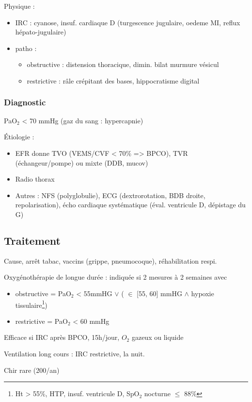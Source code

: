 \documentclass{article}
\begin{document}
Physique : 
\begin{itemize}
\item IRC : cyanose, insuf. cardiaque D (turgescence jugulaire, oedeme MI, reflux
  hépato-jugulaire)
\item patho : 
  \begin{itemize}
  \item obstructive : distension thoracique, dimin. bilat murmure vésicul
  \item restrictive : râle crépitant des bases, hippocratisme digital
  \end{itemize}
\end{itemize}

\subsubsection{Diagnostic}
\label{sec:org7599c0f}
PaO\(_{\text{2}}\) < 70 mmHg (gaz du sang : hypercapnie)

Étiologie :
\begin{itemize}
\item EFR donne TVO (VEMS/CVF < 70\% => BPCO), TVR (échangeur/pompe) ou
mixte (DDB, mucov)
\item  Radio thorax
\item Autres : NFS (polyglobulie), ECG (dextrorotation, BDB droite, repolarisation),
écho cardiaque systématique (éval. ventricule D, dépistage du G)
\end{itemize}

\subsection{Traitement}
\label{sec:org870a2d5}
Cause, arrêt tabac, vaccins (grippe, pneumocoque), réhabilitation respi.

Oxygénothérapie de longue durée : indiquée si 2 mesures à 2 semaines avec
\begin{itemize}
\item obstructive = PaO\(_{\text{2}}\) < 55mmHG \(\vee\) ( \(\in\) [55, 60] mmHG \(\wedge\) hypoxie
  tissulaire\footnote{Ht > 55\%, HTP, insuf. ventricule D, SpO\(_{\text{2}}\) nocturne \(\le\) 88\%})
\item restrictive = PaO\(_{\text{2}}\) < 60 mmHg
\end{itemize}
Efficace si  IRC après BPCO, 15h/jour, $O_2$ gazeux ou liquide

Ventilation long cours : IRC restrictive, la nuit.

Chir rare (200/an)
\end{document}
